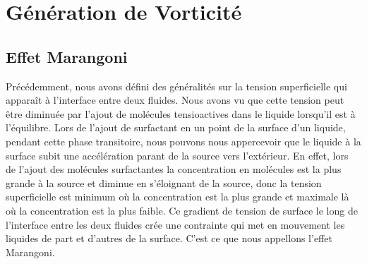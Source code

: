 \part{Génération de Vorticité}
  \chapter{Effet Marangoni}

  Précédemment, nous avons défini des généralités sur la tension superficielle qui apparaît à l'interface entre deux fluides. Nous avons vu que cette tension peut être diminuée par l'ajout de molécules tensioactives dans le liquide lorsqu'il est à l'équilibre. Lors de l'ajout de surfactant en un point de la surface d'un liquide, pendant cette phase transitoire, nous pouvons nous appercevoir que le liquide à la surface subit une accélération parant de la source vers l'extérieur. En effet, lors de l'ajout des molécules surfactantes la concentration en molécules est la plus grande à la source et diminue en s'éloignant de la source, donc la tension superficielle est minimum où la concentration est la plus grande et maximale là où la concentration est la plus faible. Ce gradient de tension de surface le long de l'interface entre les deux fluides crée une contrainte qui met en mouvement les liquides de part et d'autres de la surface. C'est ce que nous appellons l'effet Marangoni.
